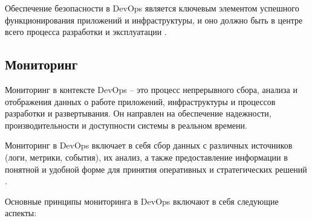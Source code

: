 \documentclass[referat]{SCWorks}
\begin{document}
Обеспечение безопасности в DevOps является ключевым элементом успешного функционирования приложений и инфраструктуры, и оно должно быть в центре всего процесса разработки и эксплуатации \cite{DevSecOps}.

\subsection{Мониторинг}

Мониторинг в контексте DevOps -- это процесс непрерывного сбора, анализа и отображения данных о работе приложений, инфраструктуры и процессов разработки и развертывания. Он направлен на обеспечение надежности, производительности и доступности системы в реальном времени.

Мониторинг в DevOps включает в себя сбор данных с различных источников (логи, метрики, события), их анализ, а также предоставление информации в понятной и удобной форме для принятия оперативных и стратегических решений \cite{Monitoring}.

Основные принципы мониторинга в DevOps включают в себя следующие аспекты:
\end{document}
